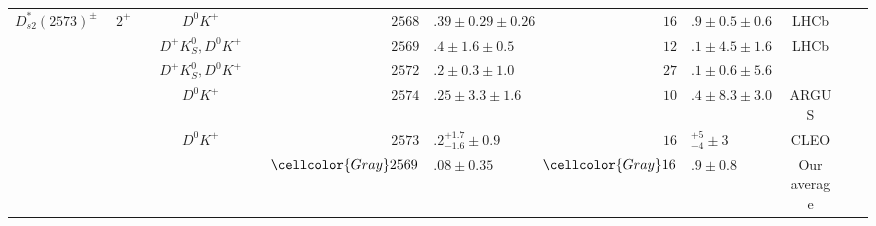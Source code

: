 \begin{adjustbox}{width=\textwidth,center}
{\begin{tabular}{cp{5pt}cp{5pt}cp{5pt}r@{}lp{5pt}r@{}lp{5pt}cp{5pt}c}
	\multirow{5}{*}{$D_{s2}^{*}(2573)^{\pm}$}	&&	\multirow{5}{*}{$2^{+}$}	&&	$D^{0}K^{+}$	&&$	2568$&$.39\pm0.29\pm0.26	$&&$	16$&$.9\pm0.5\pm0.6	$&&	LHCb	&&	\cite{Aaij:2014baa}           \\
		&&		&&	$D^{+}K_{S}^{0}, D^{0}K^{+}$	&&$	2569$&$.4\pm1.6\pm0.5	$&&$	12$&$.1\pm4.5\pm1.6	$&&	LHCb	&&	\cite{Aaij:2011ju}            \\
		&&		&&	$D^{+}K_{S}^{0}, D^{0}K^{+}$	&&$	2572$&$.2\pm0.3\pm1.0	$&&$	27$&$.1\pm0.6\pm5.6	$&&	\babar{}	&&	\cite{Aubert:2006mh}          \\
		&&		&&	$D^{0}K^{+}$	&&$	2574$&$.25\pm3.3\pm1.6	$&&$	10$&$.4\pm8.3\pm3.0	$&&	ARGUS	&&	\cite{Albrecht:1995qx}        \\
		&&		&&	$D^{0}K^{+}$	&&$	2573$&$.2 _{-1.6}^{+1.7}\pm0.9	$&&$	16$&${}_{-4}^{+5}\pm3	$&&	CLEO	&&	\cite{Kubota:1994gn}          \\ \cmidrule{6-14}
		&&		&&		&\cellcolor{Gray}&$	\cellcolor{Gray}2569$&\cellcolor{Gray}$.08 \pm 0.35	$&\cellcolor{Gray}&$	\cellcolor{Gray} 16$&\cellcolor{Gray}$.9 \pm 0.8	$&\cellcolor{Gray}&	\cellcolor{Gray}Our average	&\cellcolor{Gray}&	\\ \midrule
													

\end{tabular}}
\end{adjustbox}
